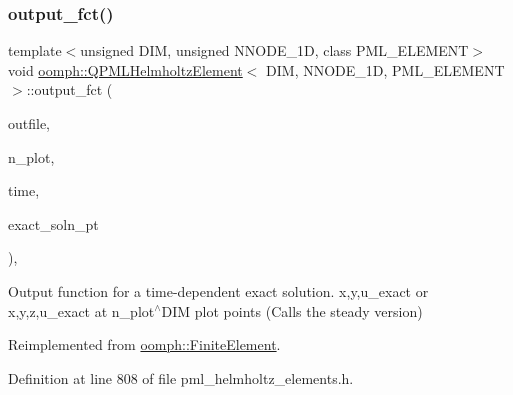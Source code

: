 \subsubsection{\texorpdfstring{output\+\_\+fct()}{output\_fct()}\hspace{0.1cm}{\footnotesize\ttfamily [2/2]}}
{\footnotesize\ttfamily template$<$unsigned D\+IM, unsigned N\+N\+O\+D\+E\+\_\+1D, class P\+M\+L\+\_\+\+E\+L\+E\+M\+E\+NT$>$ \\
void \hyperlink{classoomph_1_1QPMLHelmholtzElement}{oomph\+::\+Q\+P\+M\+L\+Helmholtz\+Element}$<$ D\+IM, N\+N\+O\+D\+E\+\_\+1D, P\+M\+L\+\_\+\+E\+L\+E\+M\+E\+NT $>$\+::output\+\_\+fct (\begin{DoxyParamCaption}\item[{std\+::ostream \&}]{outfile,  }\item[{const unsigned \&}]{n\+\_\+plot,  }\item[{const double \&}]{time,  }\item[{\hyperlink{classoomph_1_1FiniteElement_ad4ecf2b61b158a4b4d351a60d23c633e}{Finite\+Element\+::\+Unsteady\+Exact\+Solution\+Fct\+Pt}}]{exact\+\_\+soln\+\_\+pt }\end{DoxyParamCaption})\hspace{0.3cm}{\ttfamily [inline]}, {\ttfamily [virtual]}}



Output function for a time-\/dependent exact solution. x,y,u\+\_\+exact or x,y,z,u\+\_\+exact at n\+\_\+plot$^\wedge$\+D\+IM plot points (Calls the steady version) 



Reimplemented from \hyperlink{classoomph_1_1FiniteElement_a2a8426dccd57b927be0ae0eec00d0479}{oomph\+::\+Finite\+Element}.



Definition at line 808 of file pml\+\_\+helmholtz\+\_\+elements.\+h.

\mbox{\label{classoomph_1_1QPMLHelmholtzElement_a4d8f14902c2b6848a0209ffc90007a6b}} 
